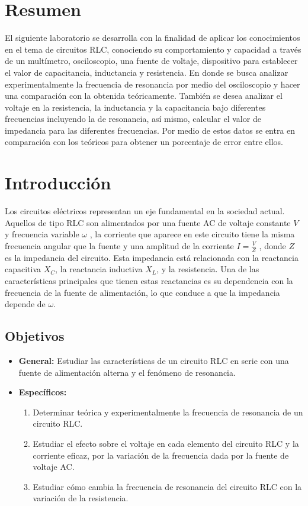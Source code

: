 \documentclass[spanish,notitlepage,letterpaper, 12pt]{article}
\begin{document}

\tableofcontents

\newpage

\section{Resumen}
El siguiente laboratorio se desarrolla con la finalidad de aplicar los conocimientos en el tema de circuitos RLC, conociendo su comportamiento y capacidad a través de un multímetro, osciloscopio, una fuente de voltaje, dispositivo para establecer el valor de capacitancia, inductancia y resistencia. En donde se busca analizar experimentalmente la frecuencia de resonancia por medio del osciloscopio y hacer una comparación con la obtenida teóricamente. También se desea analizar el voltaje en la resistencia, la inductancia y la capacitancia bajo diferentes frecuencias incluyendo la de resonancia, así mismo, calcular el valor de impedancia para las diferentes frecuencias. Por medio de estos datos se entra en comparación con los teóricos para obtener un porcentaje de error entre ellos.
\section{Introducción}
Los circuitos eléctricos representan un eje fundamental en la sociedad actual. Aquellos de tipo RLC son alimentados por una
fuente AC de voltaje constante $V$ y frecuencia variable $\omega$ , la corriente que
aparece en este circuito tiene la misma frecuencia angular que la fuente y una
amplitud de la corriente $I = \frac{V}{Z}$ , donde $Z$ es la impedancia del circuito. Esta
impedancia está relacionada con la reactancia capacitiva $X_C$, la reactancia
inductiva $X_L$, y la resistencia. Una de las características principales que tienen
estas reactancias es su dependencia con la frecuencia de la fuente de
alimentación, lo que conduce a que la impedancia depende de $\omega$.\par
\subsection{Objetivos}
\begin{itemize}
    \item \textbf{General: }Estudiar las características de un circuito RLC en serie con una fuente de
alimentación alterna y el fenómeno de resonancia.
\item \textbf{Específicos: }
    \begin{enumerate}
        \item Determinar teórica y experimentalmente la frecuencia de resonancia de un circuito RLC.
        \item Estudiar el efecto sobre el voltaje en cada elemento del circuito RLC y la
corriente eficaz, por la variación de la frecuencia dada por la fuente de
voltaje AC.
        \item Estudiar cómo cambia la frecuencia de resonancia del circuito RLC con
la variación de la resistencia.
    \end{enumerate}
\end{itemize}
\end{document}
